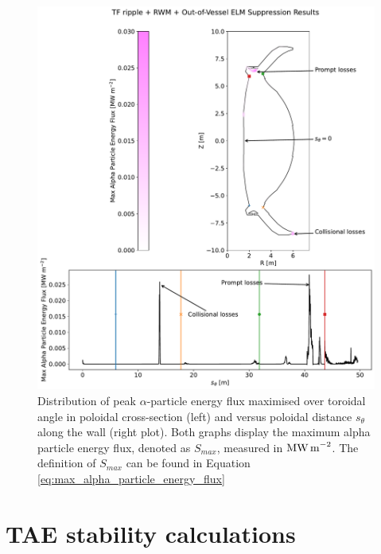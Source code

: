 \documentclass[10pt, a4paper, twoside]{article}
\begin{document}
\begin{figure}
    \centering
    \includegraphics[width=0.99\linewidth]{Figures/energy_flux_full_3d.pdf}
    \caption{Distribution of peak $\alpha$-particle energy flux maximised over toroidal angle in poloidal cross-section (left) and versus poloidal distance $s_\theta$ along the wall (right plot). Both graphs display the maximum alpha particle energy flux, denoted as $S_{max}$, measured in $\text{MW\,m}^{-2}$. The definition of $S_{max}$ can be found in Equation \eqref{eq:max_alpha_particle_energy_flux}}
    \label{fig:energy_flux_full_3d}
\end{figure}

\newpage
\section{TAE stability calculations}
\label{sec:halo_work}
\end{document}
